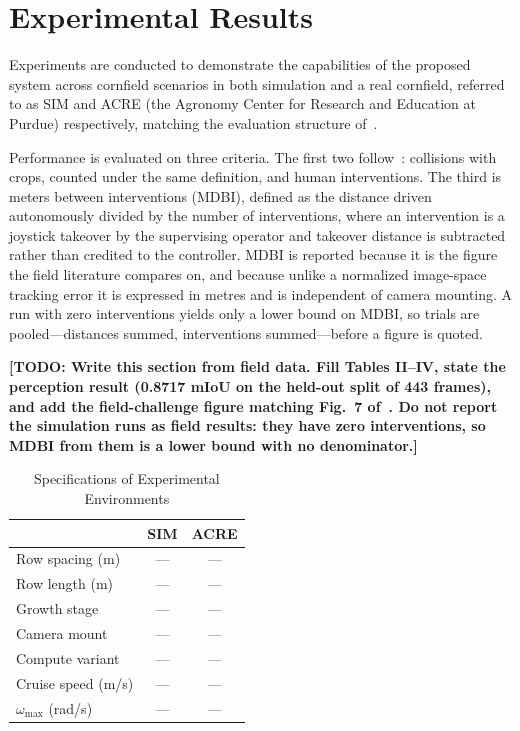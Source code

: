 \documentclass[conference]{IEEEtran}
\newcommand{\TODO}[1]{\textbf{[TODO: #1]}}
\begin{document}
\section{Experimental Results}
\label{sec:results}
Experiments are conducted to demonstrate the capabilities of the proposed system
across cornfield scenarios in both simulation and a real cornfield, referred to
as SIM and ACRE (the Agronomy Center for Research and Education at Purdue)
respectively, matching the evaluation structure of~\cite{kim2025pagnav}.

Performance is evaluated on three criteria. The first two
follow~\cite{kim2025pagnav}: collisions with crops, counted under the same
definition, and human interventions. The third is meters between interventions
(MDBI), defined as the distance driven autonomously divided by the number of
interventions, where an intervention is a joystick takeover by the supervising
operator and takeover distance is subtracted rather than credited to the
controller. MDBI is reported because it is the figure the field literature
compares on, and because unlike a normalized image-space tracking error it is
expressed in metres and is independent of camera mounting. A run with zero
interventions yields only a lower bound on MDBI, so trials are pooled---distances
summed, interventions summed---before a figure is quoted.

\TODO{Write this section from field data. Fill Tables II--IV, state the
perception result (0.8717 mIoU on the held-out split of 443 frames), and add the
field-challenge figure matching Fig.~7 of~\cite{kim2025pagnav}. Do not report
the simulation runs as field results: they have zero interventions, so MDBI from
them is a lower bound with no denominator.}

\begin{table}[t]
\caption{Specifications of Experimental Environments}
\label{tab:envs}
\centering
\begin{tabular}{lcc}
\toprule
 & SIM & ACRE \\
\midrule
Row spacing (m)        & --- & --- \\
Row length (m)         & --- & --- \\
Growth stage           & --- & --- \\
Camera mount           & --- & --- \\
Compute variant        & --- & --- \\
Cruise speed (m/s)     & --- & --- \\
$\omega_{\max}$ (rad/s) & --- & --- \\
\bottomrule
\end{tabular}
\end{table}
\end{document}
